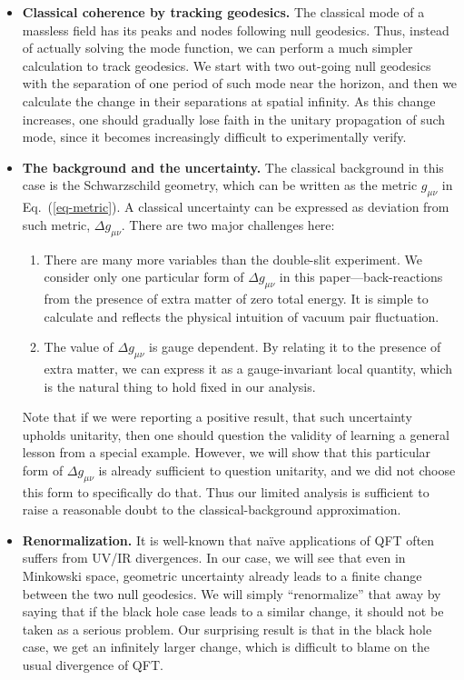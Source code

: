 \documentclass[aps,showpacs,onecolumn,floats,prd,superscriptaddress,nofootinbib]{revtex4-1}
\begin{document}
\begin{itemize}
\item {\bf Classical coherence by tracking geodesics.} The classical mode of a massless field has its peaks and nodes following null geodesics.
Thus, instead of actually solving the mode function, we can perform a much simpler calculation to track geodesics.
We start with two out-going null geodesics with the separation of one period of such mode near the horizon, and then we calculate the change in their separations at spatial infinity.
As this change increases, one should gradually lose faith in the unitary propagation of such mode, since it becomes increasingly difficult to experimentally verify.
\item {\bf The background and the uncertainty.} The classical background in this case is the Schwarzschild geometry, which can be written as the metric $g_{\mu\nu}$ in Eq.~(\ref{eq-metric}). 
A classical uncertainty can be expressed as deviation from such metric, $\Delta g_{\mu\nu}$. 
There are two major challenges here:
\begin{enumerate}
\item There are many more variables than the double-slit experiment. 
We consider only one particular form of $\Delta g_{\mu\nu}$ in this paper---back-reactions from the presence of extra matter of zero total energy. 
It is simple to calculate and reflects the physical intuition of vacuum pair fluctuation.
\item The value of $\Delta g_{\mu\nu}$ is gauge dependent. 
By relating it to the presence of extra matter, we can express it as a gauge-invariant local quantity, which is the natural thing to hold fixed in our analysis.
\end{enumerate}
Note that if we were reporting a positive result, that such uncertainty upholds unitarity, then one should question the validity of learning a general lesson from a special example. However, we will show that this particular form of $\Delta g_{\mu\nu}$ is already sufficient to question unitarity, and we did not choose this form to specifically do that. Thus our limited analysis is sufficient to raise a reasonable doubt to the classical-background approximation.
\item {\bf Renormalization.} It is well-known that na\"ive applications of QFT often suffers from UV/IR divergences.
In our case, we will see that even in Minkowski space, geometric uncertainty already leads to a finite change between the two null geodesics.
We will simply ``renormalize'' that away by saying that if the black hole case leads to a similar change, it should not be taken as a serious problem.
Our surprising result is that in the black hole case, we get an infinitely larger change, which is difficult to blame on the usual divergence of QFT.
\end{itemize}
\end{document}
